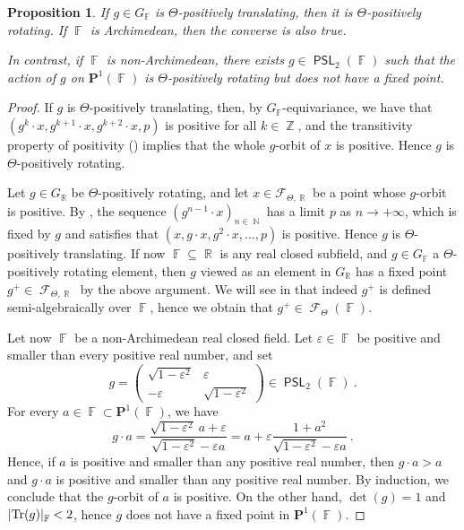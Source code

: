 \documentclass{amsart}
\theoremstyle{plain}
\newtheorem{proposition}{Proposition}[section]
\theoremstyle{definition}
\DeclareMathOperator{\PSL}{\mathsf{PSL}}
\DeclareMathOperator{\Fc}{\mathcal{F}}
\DeclareMathOperator{\Fb}{{\mathbb{F}}}
\DeclareMathOperator{\Nb}{{\mathbb{N}}}
\DeclareMathOperator{\Rb}{{\mathbb{R}}}
\DeclareMathOperator{\Zb}{\mathbb{Z}}
\newcommand{\1}{\mathbf{1}}
\begin{document}
\begin{proposition}
\label{propo: PosTransPosRot}
    If $g \in G_{\Fb}$ is $\Theta$-positively translating, then it is $\Theta$-positively rotating. If $\Fb$ is Archimedean, then the converse is also true.
    
    In contrast, if $\Fb$ is non-Archimedean, there exists $g\in \PSL_2(\Fb)$ such that the action of $g$ on $\mathbf{P}^1(\Fb)$ is $\Theta$-positively rotating but does not have a fixed point.
\end{proposition}
\begin{proof}
    If $g$ is $\Theta$-positively translating, then, by $G_{\Fb}$-equivariance, we have that $(g^k\cdot x, g^{k+1}\cdot x, g^{k+2}\cdot x, p)$ is positive for all $k\in \Zb$, and the transitivity property of positivity () implies that the whole $g$-orbit of $x$ is positive. Hence $g$ is $\Theta$-positively rotating. 

    Let $g\in G_{\Rb}$ be $\Theta$-positively rotating, and let $x\in \mathcal F_{\Theta,\Rb}$ be a point whose $g$-orbit is positive.
    By , the sequence $(g^{n-1}\cdot x)_{n\in \Nb}$ has a limit $p$ as $n\to +\infty$, which is fixed by $g$ and satisfies that $(x,g\cdot x, g^2\cdot x,\ldots, p)$ is positive. Hence $g$ is $\Theta$-positively translating.
    If now $\Fb \subseteq \Rb$ is any real closed subfield, and $g\in G_{\Fb}$ a $\Theta$-positively rotating element, then $g$ viewed as an element in $G_{\Rb}$ has a fixed point $g^+ \in \Fc_{\Theta,\Rb}$ by the above argument.
    We will see in  that indeed $g^+$ is defined semi-algebraically over $\Fb$, hence we obtain that $g^+ \in \Fc_\Theta(\Fb)$.

    Let now $\Fb$ be a non-Archimedean real closed field.
    Let $\varepsilon \in \Fb$ be positive and smaller than every positive real number, and set
    \[g = \left( \begin{matrix}
                    \sqrt{1-\varepsilon^2} & \varepsilon \\ 
                    -\varepsilon & \sqrt{1-\varepsilon^2}
    \end{matrix}\right) \in \PSL_2(\Fb)~. \]
    For every $a \in \Fb \subset \mathbf P^1(\Fb)$, we have
    \[
    g\cdot a = \frac{\sqrt{1-\varepsilon^2} \ a + \varepsilon}{\sqrt{1-\varepsilon^2}-\varepsilon a}=a + \varepsilon \frac{1+a^2}{\sqrt{1-\varepsilon^2} - \varepsilon a}~.
    \]
    Hence, if $a$ is positive and smaller than any positive real number, then $g\cdot a > a$ and $g\cdot a$ is positive and smaller than any positive real number.
    By induction, we conclude that the $g$-orbit of $a$ is positive.
    On the other hand, $\det(g) = 1$ and $\vert \textnormal{Tr}(g) \vert_{\Fb} <2$, hence $g$ does not have a fixed point in $\mathbf{P}^1(\Fb)$.
\end{proof}
\end{document}

